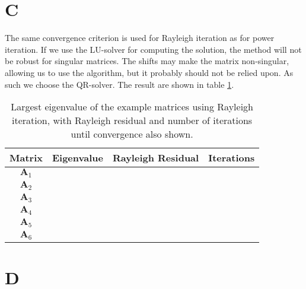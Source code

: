 \documentclass[a4paper,10pt]{article}
\begin{document}
	\section*{C}
	The same convergence criterion is used for Rayleigh iteration as for power iteration. If we use the LU-solver for computing the solution, the method will not be robust for singular matrices. The shifts may make the matrix non-singular, allowing us to use the algorithm, but it probably should not be relied upon. As such we choose the QR-solver. The result are shown in table \ref{tab:rayleigh_iter}.
	
	\begin{table}[H]
		\centering
		\begin{tabular}{c|c|c|c}
			Matrix & Eigenvalue & Rayleigh Residual & Iterations \\
			\hline
			$ \textbf{A}_1 $ & & & \\
			$ \textbf{A}_2 $ & & & \\
			$ \textbf{A}_3 $ & & & \\
			$ \textbf{A}_4 $ & & & \\
			$ \textbf{A}_5 $ & & & \\
			$ \textbf{A}_6 $ & & &
		\end{tabular}
		\caption{Largest eigenvalue of the example matrices using Rayleigh iteration, with Rayleigh residual and number of iterations until convergence also shown.}
		\label{tab:rayleigh_iter}
	\end{table}
	
	
	\section*{D}
	
	
	
	
	
\end{document}
